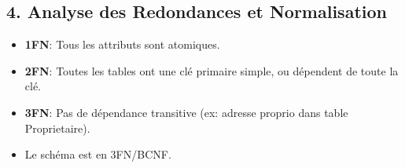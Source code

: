 \documentclass[a4paper,12pt]{article}
\begin{document}
\subsection*{4. Analyse des Redondances et Normalisation}
\begin{itemize}
    \item \textbf{1FN}: Tous les attributs sont atomiques.
    \item \textbf{2FN}: Toutes les tables ont une clé primaire simple, ou dépendent de toute la clé.
    \item \textbf{3FN}: Pas de dépendance transitive (ex: adresse proprio dans table Proprietaire).
    \item Le schéma est en 3FN/BCNF.
\end{itemize}
\end{document}
